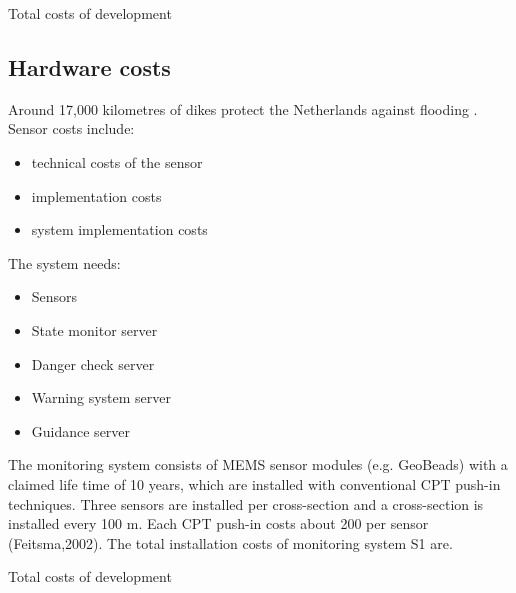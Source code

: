 \begin{table}[H]
	\pgfplotstabletypeset[
		Costs
	]\tdevcost
\caption{Total costs of development}
\label{table:total-dev-costs1}
\end{table}

\subsection{Hardware costs}
Around 17,000 kilometres of dikes protect the Netherlands against flooding \cite{DMC}. 
Sensor costs include:
\begin{itemize}
	\item technical costs of the sensor
	\item implementation costs
	\item system implementation costs
\end{itemize}

The system needs:
\begin{itemize}
	\item Sensors
	\item {State monitor server}
	\item {Danger check server}	
	\item {Warning system server}	
	\item {Guidance server}	
\end{itemize}

The monitoring system consists of MEMS sensor modules (e.g. GeoBeads) with a claimed life time of 10 years, which are installed with conventional CPT push-in techniques. Three sensors are installed per cross-section and a cross-section is installed every 100 m.
Each CPT push-in costs about \EUR{}200 per sensor (Feitsma,2002).
The total installation costs of monitoring system S1 are.

\begin{table}[H]
\caption{Total costs of development}
\label{table:total-dev-costs2}
\end{table}

